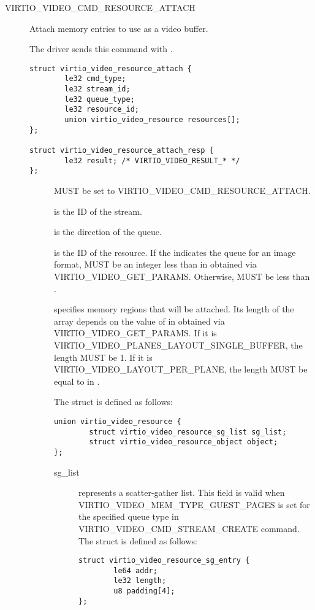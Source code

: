 \begin{description}
\item[VIRTIO_VIDEO_CMD_RESOURCE_ATTACH] Attach memory entries to use as a video
  buffer.

The driver sends this command with .
\begin{lstlisting}
struct virtio_video_resource_attach {
        le32 cmd_type;
        le32 stream_id;
        le32 queue_type;
        le32 resource_id;
        union virtio_video_resource resources[];
};

struct virtio_video_resource_attach_resp {
        le32 result; /* VIRTIO_VIDEO_RESULT_* */
};
\end{lstlisting}
\begin{description}
\item[] MUST be set to VIRTIO_VIDEO_CMD_RESOURCE_ATTACH.
\item[] is the ID of the stream.
\item[] is the direction of the queue.
\item[] is the ID of the resource. If the 
  indicates the queue for an image format,  MUST be an
  integer less than  in 
  obtained via VIRTIO_VIDEO_GET_PARAMS. Otherwise,  MUST be
  less than .
\item[] specifies memory regions that will be attached. Its
  length of the array depends on the value of  in
   obtained via VIRTIO_VIDEO_GET_PARAMS. If it is
  VIRTIO_VIDEO_PLANES_LAYOUT_SINGLE_BUFFER, the length MUST be 1. If it is
  VIRTIO_VIDEO_LAYOUT_PER_PLANE, the length MUST be equal to 
  in .

  The struct  is defined as follows:
  \begin{lstlisting}
union virtio_video_resource {
        struct virtio_video_resource_sg_list sg_list;
        struct virtio_video_resource_object object;
};
\end{lstlisting}
\begin{description}
  \item[sg_list] represents a scatter-gather list. This field is valid when
    VIRTIO_VIDEO_MEM_TYPE_GUEST_PAGES is set for the specified queue type in
    VIRTIO_VIDEO_CMD_STREAM_CREATE command. The struct
     is defined as follows:
    \begin{lstlisting}
struct virtio_video_resource_sg_entry {
        le64 addr;
        le32 length;
        u8 padding[4];
};


\end{lstlisting}
\end{description}
\end{description}
\end{description}
